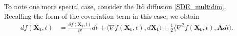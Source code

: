 \documentclass[12pt]{article}
\newcommand{\B}[1]{\boldsymbol{#1}}
\newcommand{\state}[1][t]{X_{#1}}
\newcommand{\ito}{\text{It}\hat{\text{o}}}
\newcommand{\diffMat}{\mathbf{A}} %
\begin{document}
To note one more special case, consider the $\ito$ diffusion \ref{SDE_multidim}. Recalling the form of the covariation term in this case, we obtain 
\begin{align*}
df(\B\state, t) &= \frac{\partial f(\B\state,t)}{\partial t}dt + \langle \nabla f(\B\state,t), d\B\state \rangle + \frac{1}{2} \langle \nabla^2 f(\B\state,t), \diffMat dt  \rangle.
\end{align*}
\end{document}
